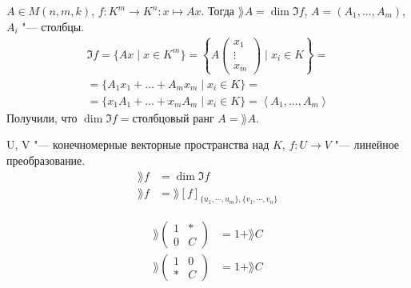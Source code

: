 \begin{Rem}
	$A \in M(n, m, k)$, $f\colon K^m \to K^n\colon x \mapsto Ax$. Тогда
	$\rang A = \dim \Im f$, $A = (A_1, \dots, A_m)$, $A_i$ "--- столбцы.
	\begin{gather*}
		\Im f = \{Ax \mid x \in K^m \} = \left\{A \begin{pmatrix}x_1\\ \vdots\\ x_m \end{pmatrix} \mid x_i \in K \right\} = \\
		= \{A_1 x_1 + \dots + A_m x_m \mid x_i \in K\} = \\
		= \{x_1 A_1 + \dots + x_m A_m \mid x_i \in K\} = \left<A_1, \dots, A_m\right>
	\end{gather*}
	Получили, что $\dim \Im f = \text{столбцовый ранг $A$} = \rang A$.
\end{Rem}

\begin{Def}
	U, V "--- конечномерные векторные пространства над $K$,
	$f\colon U \to V$ "--- линейное преобразование.
	\begin{align*}
		\rang f &= \dim \Im f \\
		\rang f &= \rang [f]_{\{u_1, \cdots, u_m\}, \{v_1, \cdots, v_n\}}
	\end{align*}
\end{Def}

\begin{conseq}
	\begin{align*}
		\rang \begin{pmatrix} 1 & * \\ 0 & C \end{pmatrix} &= 1 + \rang C \\
		\rang \begin{pmatrix} 1 & 0 \\ * & C \end{pmatrix} &= 1 + \rang C
	\end{align*}
\end{conseq}
